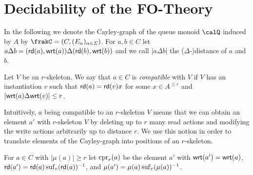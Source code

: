 \section{Decidability of the FO-Theory}
In the following we denote the Cayley-graph of the queue monoid $\Qx$ induced by $A$ by $\frakC=(C,(E_\alpha)_{\alpha\in\Sigma})$. 
For $a,b\in C$ let $a\Delta b = (\mathsf{rd}(a), \mathsf{wrt}(a))\Delta (\mathsf{rd}(b), \mathsf{wrt}(b))$ and we call $|a\Delta b|$ the ($\Delta$-)distance of $a$ and $b$. 
\begin{definition}
	Let $V$ be an $r$-skeleton. We say that $a\in C$ is \emph{compatible} with $V$ 
	if $V$ has an instantiation $v$ such that $\mathsf{rd}(a)= \mathsf{rd}(v)x$ for some $x\in A^{\leq r}$ and 
	$|\mathsf{wrt}(a) \Delta \mathsf{wrt}(v)| \leq r$.
\end{definition}
Intuitively, $a$ being compatible to an $r$-skeleton $V$ means that we can obtain an element
$a'$ with $r$-skeleton $V$ by deleting up to $r$ many  read actions and modifying the write
actions arbitrarily up to distance $r$. We use this notion in order to translate elements of the Cayley-graph
into positions of an $r$-skeleton.

\begin{definition}
	For $a\in C$ with $|\mu(a)| \geq r$ let $\operatorname{cpr}_r(a)$ be the element $a'$  with $\mathsf{wrt}(a') = \mathsf{wrt}(a)$, $\mathsf{rd}(a')=\mathsf{rd}(a)\operatorname{suf}_{r}({\mathsf{rd}(a)})^{-1}$, and $\mu(a') = \mu(a) \operatorname{suf}_{r}({\mu({a})})^{-1}$.
\end{definition}

